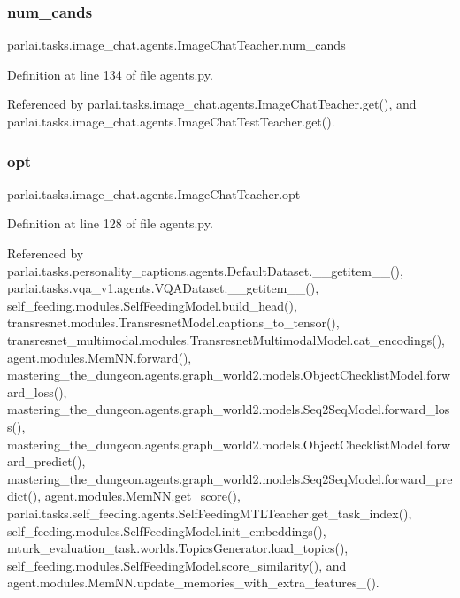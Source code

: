 \subsubsection{\texorpdfstring{num\+\_\+cands}{num\_cands}}
{\footnotesize\ttfamily parlai.\+tasks.\+image\+\_\+chat.\+agents.\+Image\+Chat\+Teacher.\+num\+\_\+cands}



Definition at line 134 of file agents.\+py.



Referenced by parlai.\+tasks.\+image\+\_\+chat.\+agents.\+Image\+Chat\+Teacher.\+get(), and parlai.\+tasks.\+image\+\_\+chat.\+agents.\+Image\+Chat\+Test\+Teacher.\+get().

\mbox{\label{classparlai_1_1tasks_1_1image__chat_1_1agents_1_1ImageChatTeacher_a64b34fbd89f984698409e85197fc6327}} 
\subsubsection{\texorpdfstring{opt}{opt}}
{\footnotesize\ttfamily parlai.\+tasks.\+image\+\_\+chat.\+agents.\+Image\+Chat\+Teacher.\+opt}



Definition at line 128 of file agents.\+py.



Referenced by parlai.\+tasks.\+personality\+\_\+captions.\+agents.\+Default\+Dataset.\+\_\+\+\_\+getitem\+\_\+\+\_\+(), parlai.\+tasks.\+vqa\+\_\+v1.\+agents.\+V\+Q\+A\+Dataset.\+\_\+\+\_\+getitem\+\_\+\+\_\+(), self\+\_\+feeding.\+modules.\+Self\+Feeding\+Model.\+build\+\_\+head(), transresnet.\+modules.\+Transresnet\+Model.\+captions\+\_\+to\+\_\+tensor(), transresnet\+\_\+multimodal.\+modules.\+Transresnet\+Multimodal\+Model.\+cat\+\_\+encodings(), agent.\+modules.\+Mem\+N\+N.\+forward(), mastering\+\_\+the\+\_\+dungeon.\+agents.\+graph\+\_\+world2.\+models.\+Object\+Checklist\+Model.\+forward\+\_\+loss(), mastering\+\_\+the\+\_\+dungeon.\+agents.\+graph\+\_\+world2.\+models.\+Seq2\+Seq\+Model.\+forward\+\_\+loss(), mastering\+\_\+the\+\_\+dungeon.\+agents.\+graph\+\_\+world2.\+models.\+Object\+Checklist\+Model.\+forward\+\_\+predict(), mastering\+\_\+the\+\_\+dungeon.\+agents.\+graph\+\_\+world2.\+models.\+Seq2\+Seq\+Model.\+forward\+\_\+predict(), agent.\+modules.\+Mem\+N\+N.\+get\+\_\+score(), parlai.\+tasks.\+self\+\_\+feeding.\+agents.\+Self\+Feeding\+M\+T\+L\+Teacher.\+get\+\_\+task\+\_\+index(), self\+\_\+feeding.\+modules.\+Self\+Feeding\+Model.\+init\+\_\+embeddings(), mturk\+\_\+evaluation\+\_\+task.\+worlds.\+Topics\+Generator.\+load\+\_\+topics(), self\+\_\+feeding.\+modules.\+Self\+Feeding\+Model.\+score\+\_\+similarity(), and agent.\+modules.\+Mem\+N\+N.\+update\+\_\+memories\+\_\+with\+\_\+extra\+\_\+features\+\_\+().

